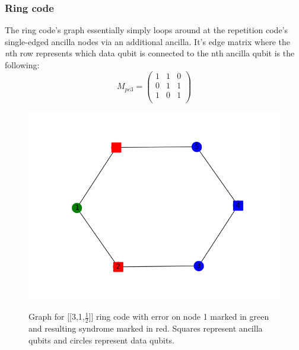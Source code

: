 \subsubsection{Ring code}
The ring code's graph essentially simply loops around at the repetition
code's single-edged ancilla nodes via an additional ancilla. 
It's edge matrix where the \emph{n}th row
represents which data qubit is connected to the nth ancilla
qubit is the following:
\begin{equation}
    M_{pc3} = \left(
        \begin{array}{ccc}
            1 & 1 & 0\\
            0 & 1 & 1\\
            1 & 0 & 1\\
        \end{array}
        \right)
\end{equation}

\begin{figure}[h!]
	\begin{center}
	\captionsetup{justification=centering,margin=2cm}
	\includegraphics[scale=0.25]{./img/figures/ring_3_graph.png}\\
	\caption{Graph for [[3,1,$\frac{1}{2}$]] ring code with error on node
    1 marked in green and resulting syndrome marked in red.
    Squares represent ancilla qubits and circles represent data qubits.}
        
	\label{fig: ring_graph}
	\end{center}
\end{figure}

